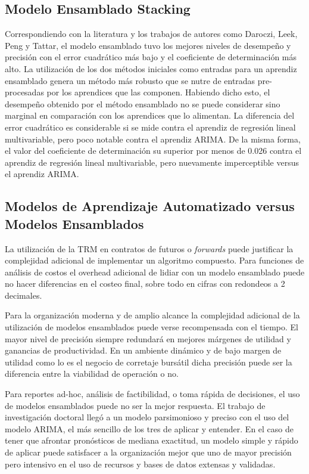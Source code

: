 \subsection{Modelo Ensamblado Stacking}
Correspondiendo con la literatura y los trabajos de autores como Daroczi, Leek, Peng y Tattar, el modelo ensamblado tuvo los mejores niveles de desempeño y precisión con el error cuadrático más bajo y el coeficiente de determinación más alto. La utilización de los dos métodos iniciales como entradas para un aprendiz ensamblado genera un método más robusto que se nutre de entradas pre-procesadas por los aprendices que las componen. Habiendo dicho esto, el desempeño obtenido por el método ensamblado no se puede considerar sino marginal en comparación con los aprendices que lo alimentan. La diferencia del error cuadrático es considerable si se mide contra el aprendiz de regresión lineal multivariable, pero poco notable contra el aprendiz ARIMA. De la misma forma, el valor del coeficiente de determinación su superior por menos de 0.026 contra el aprendiz de regresión lineal multivariable, pero nuevamente imperceptible versus el aprendiz ARIMA.

\subsection{Modelos de Aprendizaje Automatizado versus Modelos Ensamblados}
La utilización de la TRM en contratos de futuros o \emph{forwards} puede justificar la complejidad adicional de implementar un algoritmo compuesto. Para funciones de análisis de costos el overhead adicional de lidiar con un modelo ensamblado puede no hacer diferencias en el costeo final, sobre todo en cifras con redondeos a 2 decimales.

Para la organización moderna y de amplio alcance la complejidad adicional de la utilización de modelos ensamblados puede verse recompensada con el tiempo. El mayor nivel de precisión siempre redundará en mejores márgenes de utilidad y ganancias de productividad. En un ambiente dinámico y de bajo margen de utilidad como lo es el negocio de corretaje bursátil dicha precisión puede ser la diferencia entre la viabilidad de operación o no.

Para reportes ad-hoc, análisis de factibilidad, o toma rápida de decisiones, el uso de modelos ensamblados puede no ser la mejor respuesta. El trabajo de investigación doctoral llegó a un modelo parsimonioso y preciso con el uso del modelo ARIMA, el más sencillo de los tres de aplicar y entender. En el caso de tener que afrontar pronósticos de mediana exactitud, un modelo simple y rápido de aplicar puede satisfacer a la organización mejor que uno de mayor precisión pero intensivo en el uso de recursos y bases de datos extensas y validadas.

